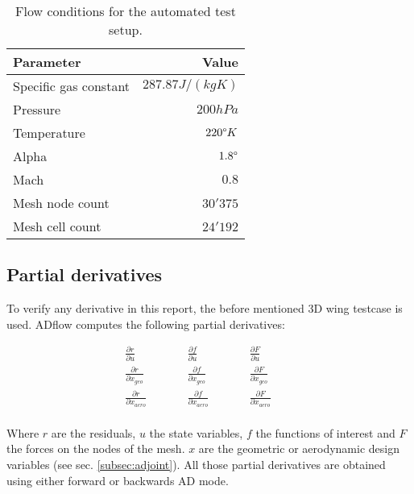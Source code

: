 \begin{table}[H]
    \centering
    \begin{tabular}{l r}
        \toprule
        Parameter               & Value \\
        \midrule
        Specific gas constant   & $287.87 J / (kg K)$ \\
        Pressure                & $200 hPa$ \\
        Temperature             & $220 \degree K$ \\
        Alpha                   & $1.8 \degree$ \\
        Mach                    & $0.8$ \\
        Mesh node count         & $30'375$ \\
        Mesh cell count         & $24'192$ \\
        \bottomrule
    \end{tabular}
    \caption{Flow conditions for the automated test setup.}
    \label{tab:3dwing_flowconditions}
\end{table}




\subsection{Partial derivatives}
To verify any derivative in this report, the before mentioned 3D wing testcase
is used. ADflow computes the following partial derivatives:

\begin{align}
    &\frac{\partial r}{\partial u}& \qquad 
    &\frac{\partial f}{\partial u}& \qquad
    &\frac{\partial F}{\partial u}& \qquad \\
%
    &\frac{\partial r}{\partial x_{geo}}& \qquad  
    &\frac{\partial f}{\partial x_{geo}}& \qquad
    &\frac{\partial F}{\partial x_{geo}}&\qquad \\
%
    &\frac{\partial r}{\partial x_{aero}}& \qquad  
    &\frac{\partial f}{\partial x_{aero}}& \qquad
    &\frac{\partial F}{\partial x_{aero}}& \qquad \\
\end{align}

\noindent Where $r$ are the residuals, $u$ the state variables, $f$ the
functions of interest and $F$ the forces on the nodes of the mesh. $x$ are the
geometric or aerodynamic design variables (see sec. \ref{subsec:adjoint}). All
those partial derivatives are obtained using either forward or backwards AD
mode.


